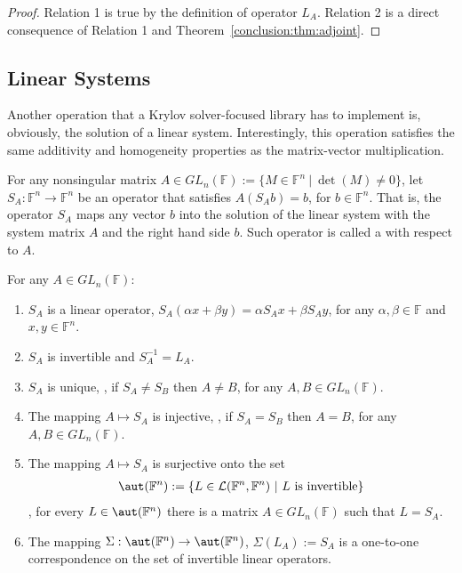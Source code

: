 \begin{proof}
Relation 1 is true by the definition of operator $L_A$. Relation 2 is a direct
consequence of Relation 1 and Theorem~\ref{conclusion:thm:adjoint}.
\end{proof}

\subsection{Linear Systems}
\label{conclusion:ssec:systems}

Another operation that a Krylov solver-focused library has to implement is,
obviously, the solution of a linear system. Interestingly, this operation
satisfies the same additivity and homogeneity properties as the matrix-vector
multiplication.

\begin{definition}
\label{conclusion:def:solver-linop}
For any nonsingular matrix $A \in GL_n(\mathbb{F}) := \lbrace M \in \mathbb{F}^n
\ \vert \ \det(M) \neq 0 \rbrace$, let $S_A : \mathbb{F}^n \rightarrow
\mathbb{F}^n$ be an operator that satisfies $A(S_Ab) = b$, for $b \in
\mathbb{F}^n$. That is, the operator $S_A$ maps any vector $b$ into the solution
of the linear system with the system matrix $A$ and the right hand side $b$.
Such operator is called a  with respect to $A$.
\end{definition}

\begin{theorem}
\label{conclusion:thm:solver-linop}
For any $A \in GL_n(\mathbb{F})$:
\begin{enumerate}
\item $S_A$ is a linear operator, \ie $S_A(\alpha x + \beta y) = \alpha S_A x +
\beta S_A y$, for any $\alpha,\beta \in \mathbb{F}$ and $x, y \in \mathbb{F}^n$.
\item $S_A$ is invertible and $S_A^{-1} = L_A^{}$.
\item $S_A$ is unique, \ie, if $S_A \neq S_B$ then $A \neq B$, for any $A, B
\in GL_n(\mathbb{F})$.
\item The mapping $A \mapsto S_A$ is injective, \ie, if $S_A = S_B$ then $A
= B$, for any $A, B \in GL_n(\mathbb{F})$.
\item The mapping $A \mapsto S_A$ is surjective onto the set
\begin{align}
\aut(\mathbb{F}^n) := \lbrace L \in \mathcal{L}(\mathbb{F}^n, \mathbb{F}^n) \
\vert \ L \text{ is invertible} \rbrace
\end{align}
\ie, for every $L \in \aut(\mathbb{F}^n)$ there is a matrix $A \in
GL_n(\mathbb{F})$ such that $L = S_A$.
\item The mapping $\Sigma : \aut(\mathbb{F}^n) \rightarrow \aut(\mathbb{F}^n)$,
$\Sigma(L_A) := S_A$ is a one-to-one correspondence on the set of invertible
linear operators.
\end{enumerate}
\end{theorem}

